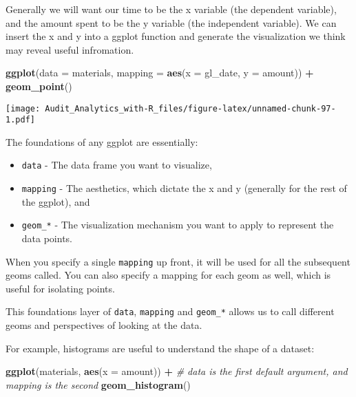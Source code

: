 \documentclass[
]{book}
\newenvironment{Shaded}{\begin{snugshade}}{\end{snugshade}}
\newcommand{\CommentTok}[1]{\textcolor[rgb]{0.56,0.35,0.01}{\textit{#1}}}
\newcommand{\DataTypeTok}[1]{\textcolor[rgb]{0.13,0.29,0.53}{#1}}
\newcommand{\KeywordTok}[1]{\textcolor[rgb]{0.13,0.29,0.53}{\textbf{#1}}}
\newcommand{\NormalTok}[1]{#1}
\newcommand{\OperatorTok}[1]{\textcolor[rgb]{0.81,0.36,0.00}{\textbf{#1}}}
\newcommand{\StringTok}[1]{\textcolor[rgb]{0.31,0.60,0.02}{#1}}
\providecommand{\tightlist}{%
  \setlength{\itemsep}{0pt}\setlength{\parskip}{0pt}}
\begin{document}
Generally we will want our time to be the x variable (the dependent variable), and the amount spent to be the y variable (the independent variable). We can insert the x and y into a ggplot function and generate the visualization we think may reveal useful infromation.

\begin{Shaded}
\begin{Highlighting}[]
\KeywordTok{ggplot}\NormalTok{(}\DataTypeTok{data =}\NormalTok{ materials, }\DataTypeTok{mapping =} \KeywordTok{aes}\NormalTok{(}\DataTypeTok{x =}\NormalTok{ gl_date, }\DataTypeTok{y =}\NormalTok{ amount)) }\OperatorTok{+}
\StringTok{  }\KeywordTok{geom_point}\NormalTok{()}
\end{Highlighting}
\end{Shaded}

\texttt{[image: Audit\_Analytics\_with-R\_files/figure-latex/unnamed-chunk-97-1.pdf]}

The foundations of any ggplot are essentially:

\begin{itemize}
\tightlist
\item
  \texttt{data} - The data frame you want to visualize,
\item
  \texttt{mapping} - The aesthetics, which dictate the x and y (generally for the rest of the ggplot), and
\item
  \texttt{geom\_*} - The visualization mechanism you want to apply to represent the data points.
\end{itemize}

When you specify a single \texttt{mapping} up front, it will be used for all the subsequent geoms called. You can also specify a mapping for each geom as well, which is useful for isolating points.

This foundations layer of \texttt{data}, \texttt{mapping} and \texttt{geom\_*} allows us to call different geoms and perspectives of looking at the data.

For example, histograms are useful to understand the shape of a dataset:

\begin{Shaded}
\begin{Highlighting}[]
\KeywordTok{ggplot}\NormalTok{(materials, }\KeywordTok{aes}\NormalTok{(}\DataTypeTok{x =}\NormalTok{ amount)) }\OperatorTok{+}\StringTok{ }\CommentTok{# data is the first default argument, and mapping is the second}
\StringTok{  }\KeywordTok{geom_histogram}\NormalTok{()}
\end{Highlighting}
\end{Shaded}
\end{document}
